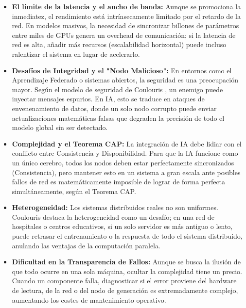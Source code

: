\documentclass[runningheads]{llncs}
\begin{document}
\begin{itemize}
    \item \textbf{El límite de la latencia y el ancho de banda:} Aunque se promociona la inmediatez, el rendimiento está intrínsecamente limitado por el retardo de la red. En modelos masivos, la necesidad de sincronizar billones de parámetros entre miles de GPUs genera un overhead de comunicación; si la latencia de red es alta, añadir más recursos (escalabilidad horizontal) puede incluso ralentizar el sistema en lugar de acelerarlo.
    \newline
    \item \textbf{Desafíos de Integridad y el "Nodo Malicioso":} En entornos como el Aprendizaje Federado o sistemas abiertos, la seguridad es una preocupación mayor. Según el modelo de seguridad de Coulouris , un enemigo puede inyectar mensajes espurios. En IA, esto se traduce en ataques de envenenamiento de datos, donde un solo nodo corrupto puede enviar actualizaciones matemáticas falsas que degraden la precisión de todo el modelo global sin ser detectado.
    \newline
    \item \textbf{Complejidad y el Teorema CAP:} La integración de IA debe lidiar con el conflicto entre Consistencia y Disponibilidad. Para que la IA funcione como un único cerebro, todos los nodos deben estar perfectamente sincronizados (Consistencia), pero mantener esto en un sistema a gran escala ante posibles fallos de red es matemáticamente imposible de lograr de forma perfecta simultáneamente, según el Teorema CAP.
    \newline
    \item \textbf{Heterogeneidad:} Los sistemas distribuidos reales no son uniformes. Coulouris destaca la heterogeneidad como un desafío; en una red de hospitales o centros educativos, si un solo servidor es más antiguo o lento, puede retrasar el entrenamiento o la respuesta de todo el sistema distribuido, anulando las ventajas de la computación paralela.
    \newline
    \item \textbf{Dificultad en la Transparencia de Fallos:} Aunque se busca la ilusión de que todo ocurre en una sola máquina, ocultar la complejidad tiene un precio. Cuando un componente falla, diagnosticar si el error proviene del hardware de lectura, de la red o del nodo de generación es extremadamente complejo, aumentando los costes de mantenimiento operativo.
\end{itemize}
\end{document}
